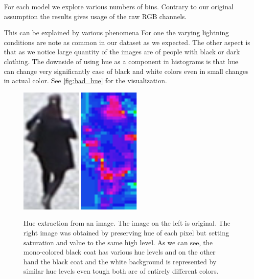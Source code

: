 For each model we explore various numbers of bins. Contrary to our original
assumption the results gives usage of the raw RGB channels.

This can be explained by various phenomena For one the varying lightning
conditions are note as common in our dataset as we expected. The other aspect
is that as we notice large quantity of the images are of people with black or
dark clothing. The downside of using hue as a component in histograms is that
hue can change very significantly case of black and white colors even in small
changes in actual color. See \autoref{fig:bad_hue} for the visualization.

\begin{figure}
    \centering
    \includegraphics[width=3cm]{img/bad_hue_orig.png}
    \includegraphics[width=3cm]{img/bad_hue_hue.png}
    \caption[Hue extraction from an image]{Hue extraction from an image. The image on the left is original. The right image was obtained by preserving hue of each pixel but setting saturation and value to the same high level. As we can see, the mono-colored black coat has various hue levels and on the other hand the black coat and the white background is represented by similar hue levels even tough both are of entirely different colors.}
    \label{fig:bad_hue}
\end{figure}

